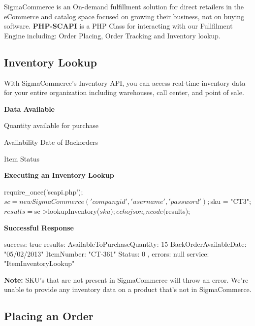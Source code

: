 Sigma\-Commerce is an On-\/demand fulfillment solution for direct retailers in the e\-Commerce and catalog space focused on growing their business, not on buying software. {\bfseries P\-H\-P-\/\-S\-C\-A\-P\-I} is a P\-H\-P Class for interacting with our Fullfilment Engine including\-: Order Placing, Order Tracking and Inventory lookup.

\subsection*{Inventory Lookup}

With Sigma\-Commerce's Inventory A\-P\-I, you can access real-\/time inventory data for your entire organization including warehouses, call center, and point of sale.

{\bfseries Data Available}


\begin{DoxyItemize}
\item Quantity available for purchase
\item Availability Date of Backorders
\item Item Status
\end{DoxyItemize}

{\bfseries Executing an Inventory Lookup} \begin{DoxyVerb}require_once('scapi.php');
$sc = new SigmaCommerce('companyid', 'username', 'password');

$sku = "CT3";
$results = $sc->lookupInventory($sku);
echo json_encode($results);
\end{DoxyVerb}


{\bfseries Successful Response} \begin{DoxyVerb}{
    success: true
    results: {
        AvailableToPurchaseQuantity: 15
        BackOrderAvailableDate: "05/02/2013"
        ItemNumber: "CT-361"
        Status: 0
    },
    errors: null
    service: "ItemInventoryLookup"
}
\end{DoxyVerb}


{\bfseries Note\-:} S\-K\-U's that are not present in Sigma\-Commerce will throw an error. We're unable to provide any inventory data on a product that's not in Sigma\-Commerce.

\subsection*{Placing an Order}

